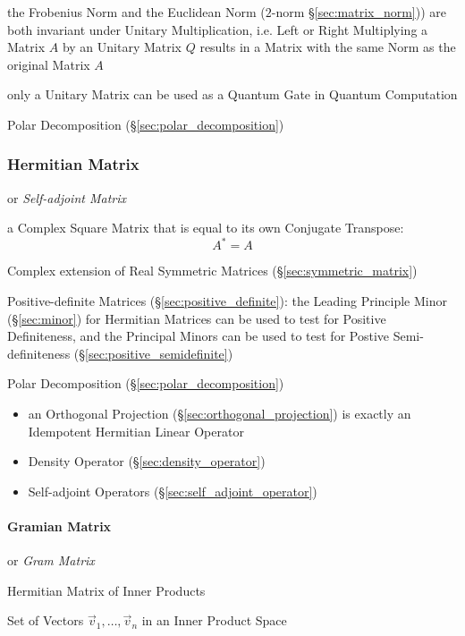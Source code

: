 the Frobenius Norm and the Euclidean Norm ($2$-norm \S\ref{sec:matrix_norm}))
are both invariant under Unitary Multiplication, i.e. Left or Right Multiplying
a Matrix $A$ by an Unitary Matrix $Q$ results in a Matrix with the same Norm as
the original Matrix $A$

only a Unitary Matrix can be used as a Quantum Gate in Quantum Computation

Polar Decomposition (\S\ref{sec:polar_decomposition})



\subsubsection{Hermitian Matrix}\label{sec:hermitian_matrix}

or \emph{Self-adjoint Matrix}

a Complex Square Matrix that is equal to its own Conjugate Transpose:
\[
  A^* = A
\]

Complex extension of Real Symmetric Matrices (\S\ref{sec:symmetric_matrix})

Positive-definite Matrices (\S\ref{sec:positive_definite}): the Leading
Principle Minor (\S\ref{sec:minor}) for Hermitian Matrices can be used to test
for Positive Definiteness, and the Principal Minors can be used to test for
Postive Semi-definiteness (\S\ref{sec:positive_semidefinite})

Polar Decomposition (\S\ref{sec:polar_decomposition})

\begin{itemize}
\item an Orthogonal Projection (\S\ref{sec:orthogonal_projection}) is exactly an
  Idempotent Hermitian Linear Operator
\item Density Operator (\S\ref{sec:density_operator})
\item Self-adjoint Operators (\S\ref{sec:self_adjoint_operator})
\end{itemize}



\paragraph{Gramian Matrix}\label{sec:gramian_matrix}\hfill

or \emph{Gram Matrix}

Hermitian Matrix of Inner Products

Set of Vectors $\vec{v}_1,\ldots,\vec{v}_n$ in an Inner Product Space

